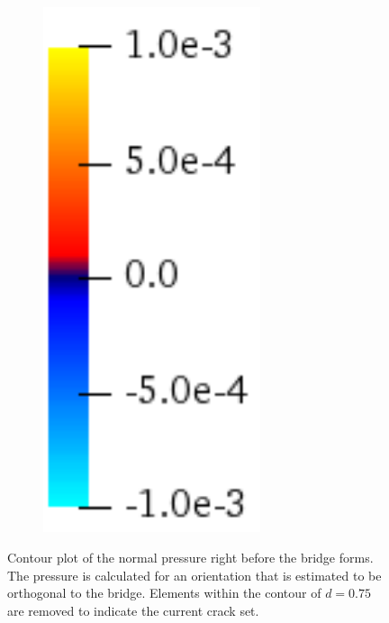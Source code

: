 \begin{figure}[htb!]
\begin{subfigure}[b]{0.15\textwidth}
    \includegraphics[width=0.7\textwidth]{Chapter4/figures/coldhot_pressure.png}
    \vspace{0.1in}
  \end{subfigure}
  \caption[Contour plot of the normal pressure right before the bridge forms.]{Contour plot of the normal pressure right before the bridge forms. The pressure is calculated for an orientation that is estimated to be orthogonal to the bridge. Elements within the contour of $d = 0.75$ are removed to indicate the current crack set. }
  \label{fig: Chapter4/biaxial_nosplit_stress}
\end{figure}
